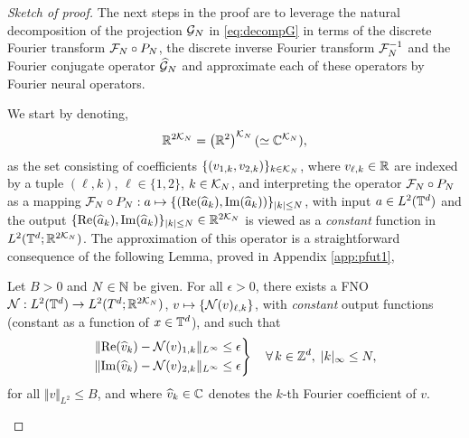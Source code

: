 \documentclass[reqno,a4paper]{amsart}
\begin{document}
\begin{proof}[Sketch of proof]
The next steps in the proof are to leverage the natural decomposition of the projection $\mathcal{G}_N$ in \eqref{eq:decompG} in terms of the discrete Fourier transform $\mathcal{F}_N\circ P_N$, the discrete inverse Fourier transform $\mathcal{F}^{-1}_N$ and the Fourier conjugate operator $\widehat{\mathcal{G}}_N$ and approximate each of these operators by Fourier neural operators. 

We start by denoting,
\begin{align}\label{eq:RKN}
\mathbb{R}^{2\mathcal{K}_N} = \left( \mathbb{R}^2 \right)^{\mathcal{K}_N} (\simeq \mathbb{C}^{\mathcal{K}_N}),
\end{align}
as the set consisting of coefficients $\{(v_{1,k},v_{2,k}) \}_{k\in \mathcal{K}_N}$, where $v_{\ell,k} \in \mathbb{R}$ are indexed by a tuple $(\ell,k)$, $\ell \in \{1,2\}$, $k \in \mathcal{K}_N$, and interpreting the operator $\mathcal{F}_N\circ P_N$ as a mapping $\mathcal{F}_N\circ P_N: a \mapsto \{(\mathrm{Re}(\widehat{a}_k), \mathrm{Im}(\widehat{a}_k))\}_{|k|\le N}$, with input $a \in L^2(\mathbb{T}^d)$ and the output $\{\mathrm{Re}(\widehat{a}_k), \mathrm{Im}(\widehat{a}_k)\}_{|k|\le N} \in \mathbb{R}^{2\mathcal{K}_N}$ is viewed as a \emph{constant} function in  $L^2(\mathbb{T}^d;\mathbb{R}^{2 \mathcal{K}_N})$. The approximation of this operator is a straightforward consequence of the following Lemma, proved in Appendix \ref{app:pfut1},
\begin{lemma} \label{lem:fno-ft}
Let $B > 0$ and $N \in \mathbb{N}$ be given. For all $\epsilon> 0$, there exists a FNO $\mathcal{N}: L^2(\mathbb{T}^d) \to L^2(T^d;\mathbb{R}^{2\mathcal{K}_N})$, $v \mapsto \{ \mathcal{N}(v)_{\ell,k} \}$, with \emph{constant} output functions (constant as a function of $x\in \mathbb{T}^d$), and such that 
\[
\left.
\begin{aligned}
\Vert 
\mathrm{Re}(\widehat{v}_k) - \mathcal{N}(v)_{1,k}
\Vert_{L^\infty} &\le \epsilon
\\
\Vert 
\mathrm{Im}(\widehat{v}_k) - \mathcal{N}(v)_{2,k}
\Vert_{L^\infty} &\le \epsilon
\end{aligned}
\right\}
\quad \forall \, k\in \mathbb{Z}^d, \; |k|_\infty \le N,
\]
for all $\Vert v \Vert_{L^2} \le B$, and where $\widehat{v}_k\in \mathbb{C}$ denotes the $k$-th Fourier coefficient of $v$.
\end{lemma}


\end{proof}
\end{document}
